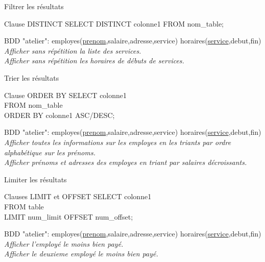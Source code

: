 \documentclass[xetex,dvipsnames]{beamer}
\begin{document}
\begin{frame}[t]{Filtrer les résultats}
	
	\begin{alertblock}{Clause DISTINCT}
		SELECT DISTINCT colonne1 FROM nom\_table;
	\end{alertblock}
	
\begin{scriptsize}
		\vspace{1em}
		BDD "atelier": employes(\underline{prenom},salaire,adresse,service) horaires(\underline{service},debut,fin)\\
		\vspace{0.5em}
		\textit{Afficher sans répétition la liste des services.}\\
		\textit{Afficher sans répétition les horaires de débuts de services.}\\
\end{scriptsize}
\end{frame}


\begin{frame}[t]{Trier les résultats}

	\begin{alertblock}{Clause ORDER BY}
		SELECT colonne1\\FROM nom\_table\\ORDER BY colonne1 ASC/DESC;
	\end{alertblock}
	
\begin{scriptsize}
		\vspace{1em}
		BDD "atelier": employes(\underline{prenom},salaire,adresse,service) horaires(\underline{service},debut,fin)\\
		\vspace{0.5em}
		\textit{Afficher toutes les informations sur les employes en les triants par ordre alphabétique sur les prénoms.}\\
		\textit{Afficher prénoms et adresses des employes en triant par salaires décroissants.}\\
\end{scriptsize}
\end{frame}


\begin{frame}[t]{Limiter les résultats}

	\begin{alertblock}{Clauses LIMIT et OFFSET}
		SELECT colonne1 \\FROM table \\LIMIT num\_limit OFFSET num\_offset;
	\end{alertblock}
\begin{scriptsize}
		\vspace{1em}
		BDD "atelier": employes(\underline{prenom},salaire,adresse,service) horaires(\underline{service},debut,fin)\\
		\vspace{0.5em}
		\textit{Afficher l'employé le moins bien payé.}\\
		\textit{Afficher le deuxieme employé le moins bien payé.}\\
\end{scriptsize}
\end{frame}
\end{document}
